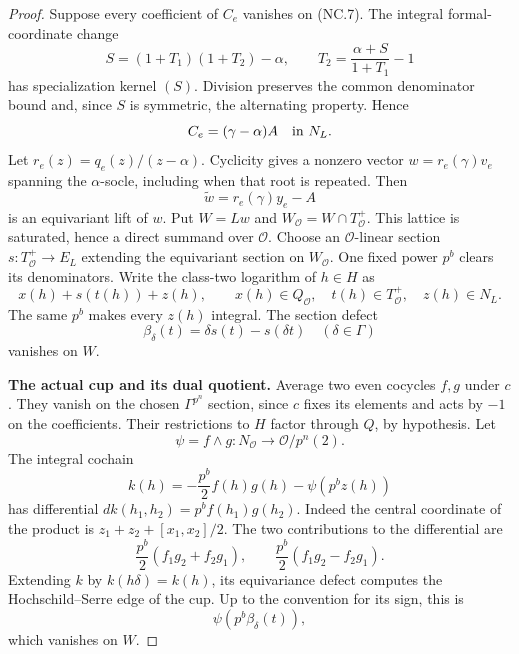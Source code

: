 \documentclass[11pt,a4paper]{article}
\theoremstyle{definition}
\begin{document}
\begin{proof}
Suppose every coefficient of \(C_e\) vanishes on (NC.7).
The integral formal-coordinate change
\[
 S=(1+T_1)(1+T_2)-\alpha,\qquad
 T_2=\frac{\alpha+S}{1+T_1}-1
\]
has specialization kernel \((S)\).  Division preserves the
common denominator bound and, since \(S\) is symmetric, the
alternating property.  Hence
\[
                        C_e=(\gamma-\alpha)A
                        \quad\hbox{in }N_L.
\]
Let \(r_e(z)=q_e(z)/(z-\alpha)\).  Cyclicity gives a nonzero
vector \(w=r_e(\gamma)v_e\) spanning the \(\alpha\)-socle,
including when that root is repeated.  Then
\[
                       \widetilde w=r_e(\gamma)y_e-A
\]
is an equivariant lift of \(w\).  Put \(W=Lw\) and
\(W_{\mathcal O}=W\cap T_{\mathcal O}^+\).
This lattice is saturated, hence a direct summand over
\(\mathcal O\).  Choose an \(\mathcal O\)-linear section
\(s:T_{\mathcal O}^+\to E_L\) extending the equivariant section
on \(W_{\mathcal O}\).  One fixed power \(p^b\) clears its
denominators.  Write the class-two logarithm of \(h\in H\) as
\[
 x(h)+s(t(h))+z(h),\qquad
 x(h)\in Q_{\mathcal O},\quad
 t(h)\in T_{\mathcal O}^+,\quad z(h)\in N_L.
\]
The same \(p^b\) makes every \(z(h)\) integral.  The section
defect
\[
            \beta_\delta(t)=\delta s(t)-s(\delta t)
            \quad(\delta\in\Gamma)
\]
vanishes on \(W\).

\par\medskip\noindent\textbf{The actual cup and its dual quotient.}
Average two even cocycles \(f,g\) under \(c\).
They vanish on the chosen \(\Gamma^{p^n}\) section, since \(c\)
fixes its elements and acts by \(-1\) on the coefficients.
Their restrictions to \(H\) factor through \(Q\), by hypothesis.
Let
\[
 \psi=f\wedge g:N_{\mathcal O}\longrightarrow
                  \mathcal O/p^n(2).
\]
The integral cochain
\[
       k(h)=-\frac{p^b}{2}f(h)g(h)-\psi(p^b z(h))            \tag{NC.10}
\]
has differential \(dk(h_1,h_2)=p^b f(h_1)g(h_2)\).
Indeed the central coordinate of the product is
\(z_1+z_2+[x_1,x_2]/2\).  The two contributions to the
differential are
\[
 \frac{p^b}{2}(f_1g_2+f_2g_1),\qquad
 \frac{p^b}{2}(f_1g_2-f_2g_1).
\]
Extending \(k\) by \(k(h\delta)=k(h)\), its equivariance
defect computes the Hochschild--Serre edge of the cup.
Up to the convention for its sign, this is
\[
                         \psi(p^b\beta_\delta(t)),          \tag{NC.11}
\]
which vanishes on \(W\).


\end{proof}
\end{document}
